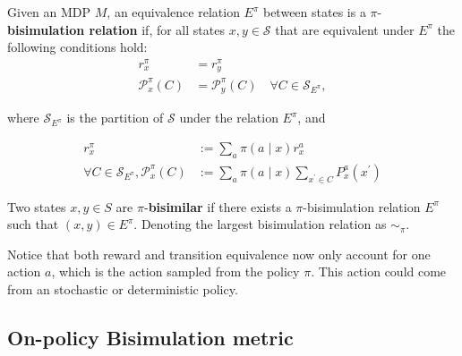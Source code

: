 \begin{definition}
Given an MDP $M$, an equivalence relation $E^\pi$ between states is a $\pi$-\textbf{bisimulation relation} if, for all states $x, y \in \mathcal{S}$ that are equivalent under $E^\pi$ the following conditions hold:
\begin{align}
\label{eq:on_policy_reward_equivalence}
r_{x}^\pi & = r_{y}^\pi
 \\
\label{eq:on_policy_transition_equivalence}
\mathcal{P}_{x}^\pi\left(C \right) & =\mathcal{P}_{y}^\pi\left(C\right) \quad \forall C \in \mathcal{S}_{E^\pi},
\end{align}

where $\mathcal{S}_{E^\pi}$ is the partition of $\mathcal{S}$ under the relation $E^\pi$, and

\begin{equation}
\begin{aligned}
\label{eq:on_policy_reward_transition}
r_x^\pi & :=\sum_a \pi(a \mid x) r_x^a \\
\forall C \in \mathcal{S}_{E^\pi}, \mathcal{P}_x^\pi(C) & :=\sum_a \pi(a \mid x) \sum_{x^{\prime} \in C} P_x^a(x^{\prime})
\end{aligned}
\end{equation}

Two states $x, y \in S$ are $\pi$-\textbf{bisimilar} if there exists a $\pi$-bisimulation relation $E^\pi$ such that $(x, y) \in E^\pi$. Denoting the largest bisimulation relation as $\sim_\pi$.
\end{definition}

Notice that both reward and transition equivalence now only account for one action $a$, which is the action sampled from the policy $\pi$. This action could come from an stochastic or deterministic policy. 


\subsection{On-policy Bisimulation metric}

